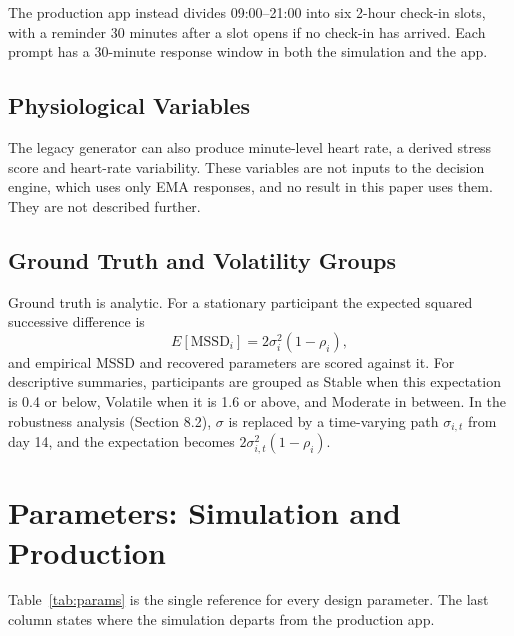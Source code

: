 \documentclass[11pt,letterpaper]{article}
\begin{document}
The production app instead divides 09:00--21:00 into six 2-hour check-in slots, with a reminder 30 minutes after a slot opens if no check-in has arrived. Each prompt has a 30-minute response window in both the simulation and the app.

\subsection{Physiological Variables}

The legacy generator can also produce minute-level heart rate, a derived stress score and heart-rate variability. These variables are not inputs to the decision engine, which uses only EMA responses, and no result in this paper uses them. They are not described further.

\subsection{Ground Truth and Volatility Groups}

Ground truth is analytic. For a stationary participant the expected squared successive difference is
\begin{equation}
E[\text{MSSD}_i] = 2\sigma_i^2(1 - \rho_i),
\end{equation}
and empirical MSSD and recovered parameters are scored against it. For descriptive summaries, participants are grouped as Stable when this expectation is 0.4 or below, Volatile when it is 1.6 or above, and Moderate in between. In the robustness analysis (Section 8.2), $\sigma$ is replaced by a time-varying path $\sigma_{i,t}$ from day 14, and the expectation becomes $2\sigma_{i,t}^2(1 - \rho_i)$.

\section{Parameters: Simulation and Production}

Table~\ref{tab:params} is the single reference for every design parameter. The last column states where the simulation departs from the production app.
\end{document}
